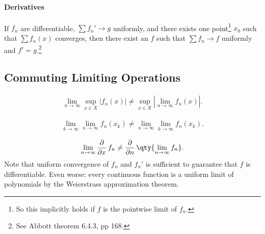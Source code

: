 \hypertarget{derivatives}{%
\paragraph{Derivatives}\label{derivatives}}

\begin{theorem}

If \(f_n\) are differentiable, \(\sum f_n' \to g\) uniformly, and there
exists one point\footnote{So this implicitly holds if \(f\) is the
  pointwise limit of \(f_n\).} \(x_0\) such that \(\sum f_n(x)\)
converges, then there exist an \(f\) such that \(\sum f_n \to f\)
uniformly and \(f' = g\).\footnote{See Abbott theorem 6.4.3, pp 168.}

\end{theorem}

\hypertarget{commuting-limiting-operations}{%
\subsection{Commuting Limiting
Operations}\label{commuting-limiting-operations}}

\begin{proposition}

\begin{align*}  
\lim_{n\to \infty}\sup_{x\in X} {\left\lvert {f_n(x) } \right\rvert} \neq \sup_{x\in X} {\left\lvert {\lim_{n\to\infty} f_n(x) } \right\rvert}
.\end{align*}

\end{proposition}

\begin{proposition}

\begin{align*}  
\lim_{k\to \infty} \lim_{n\to\infty} f_n(x_k) \neq
\lim_{n\to \infty} \lim_{k\to\infty} f_n(x_k)
.\end{align*}

\end{proposition}

\begin{proposition}

\begin{align*}  
\lim_{n\to \infty} {\frac{\partial }{\partial x}\,} f_n \neq {\frac{\partial }{\partial n}\,} \qty{\lim_{n\to \infty} f_n}
.\end{align*}
Note that uniform convergence of \(f_n\) and \(f_n'\) is sufficient to
guarantee that \(f\) is differentiable. Even worse: every continuous
function is a uniform limit of polynomials by the Weierstrass
approximation theorem.

\end{proposition}

